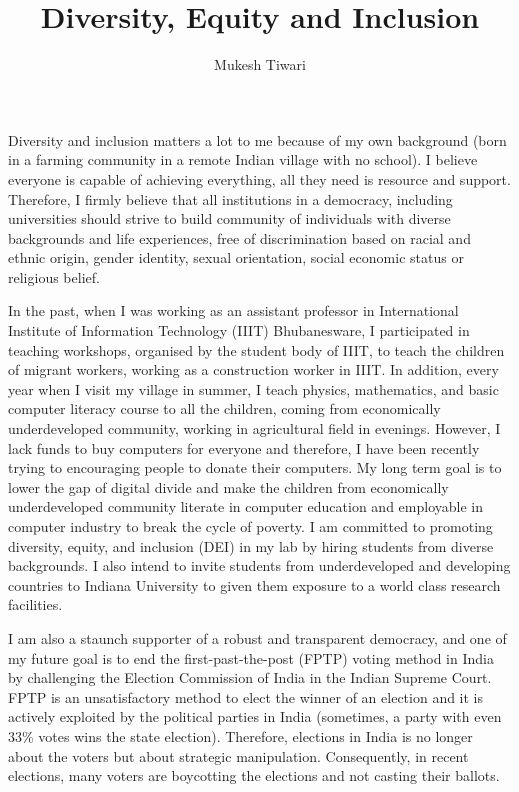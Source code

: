 \documentclass[a4paper]{article}
\title{Diversity, Equity and Inclusion}
\author{Mukesh Tiwari}
\date{}
\begin{document}
\fontsize{12}{15}
\selectfont
\maketitle

Diversity and inclusion matters a lot to me because of my own background (born in 
a farming community in a remote Indian village with no school). I believe everyone is capable of 
achieving everything, all they need is resource and support. Therefore,  I firmly believe that 
all institutions in a democracy, including universities should strive to build
community of individuals with diverse backgrounds and life experiences, 
free of discrimination based on racial and ethnic origin, gender identity, 
sexual orientation, social economic status or religious belief. 

\vspace{0.5cm}
In the past, when I was working as an assistant professor in International Institute of 
Information Technology (IIIT) Bhubanesware, I participated in teaching 
workshops, organised by the student body of IIIT, to teach the 
children of migrant workers, working as a construction worker in IIIT.
In addition, every year when I visit my village 
in summer, I teach physics, mathematics, and basic computer literacy course to 
all the children, coming from 
economically underdeveloped community, working in 
agricultural field in evenings. However, I lack funds to buy computers for everyone 
and therefore, I have been recently trying to encouraging people to donate 
their computers. My long term goal is to lower the gap of digital divide and make the 
children from economically underdeveloped community literate in computer education 
and employable in computer industry to break the cycle of poverty. 
I am committed to promoting diversity, equity, and inclusion (DEI) in my lab by 
hiring students from diverse backgrounds. I also intend to invite 
students from underdeveloped and developing countries to Indiana University 
to given them exposure to a world class research facilities. 



\vspace{0.5cm}
I am also a staunch supporter of a robust and transparent 
democracy, and one of my future goal is to end the 
first-past-the-post (FPTP) voting method in India by challenging the Election 
Commission of India in the Indian Supreme Court. FPTP is an unsatisfactory method 
to elect the winner of an election and it is actively exploited by 
the political parties in India (sometimes, a party with even 33\% votes 
wins the state election). Therefore, elections in India is no longer 
about the voters but about strategic manipulation. Consequently, 
in recent elections, many voters are boycotting the elections and 
not casting their ballots. 
\end{document}
